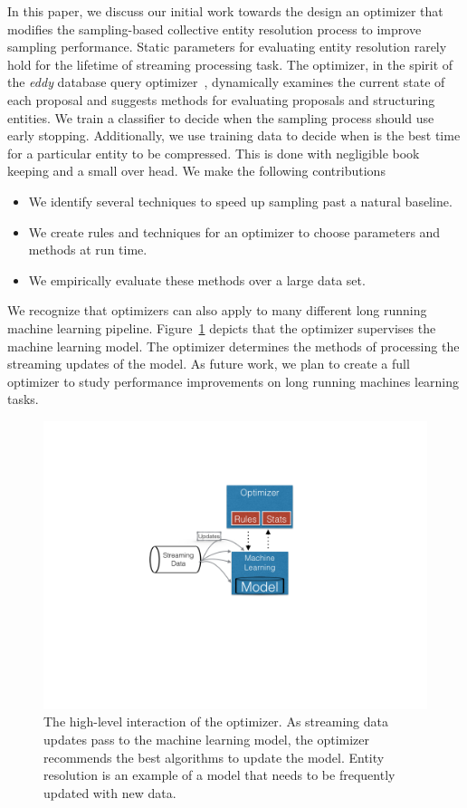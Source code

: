 In this paper, we discuss our initial work towards the design an optimizer that modifies the
sampling-based collective entity resolution process to improve sampling performance.
Static parameters for evaluating entity resolution rarely hold for the lifetime of streaming processing task.
The optimizer, in the spirit of the \textit{eddy} database query optimizer~\cite{avnur2000eddies}, dynamically examines the
current state of each proposal and suggests methods for evaluating proposals and structuring entities.
We train a classifier to decide when the sampling process should use early stopping.
Additionally, we use training data to decide when is the best time for a particular entity to be compressed.
This is done with negligible book keeping and a small over head.
We make the following contributions
\begin{itemize}
\item We identify several techniques to speed up sampling past a natural baseline.
\item We create rules and techniques for an optimizer to choose parameters and methods at run time.
\item We empirically evaluate these methods over a large data set.
\end{itemize}
We recognize that optimizers can also apply to many different long running machine learning pipeline.
Figure~\ref{fig:optimizer-arch} depicts that the optimizer supervises the machine learning model.
The optimizer determines the methods of processing the streaming updates of the model. 
As future work, we plan to create a full optimizer to study performance improvements on long running machines learning tasks.


\begin{figure}
\centering
\includegraphics[width=\columnwidth, clip=true, trim= 25em 30em 30em 17em]{media/optimizer/optimizer.png}
\caption{The high-level interaction of the optimizer. As streaming data updates pass to the machine learning model, the optimizer recommends the best algorithms to update the model. Entity resolution is an example of a model that needs to be frequently updated with new data.}
\label{fig:optimizer-arch}
\end{figure}



